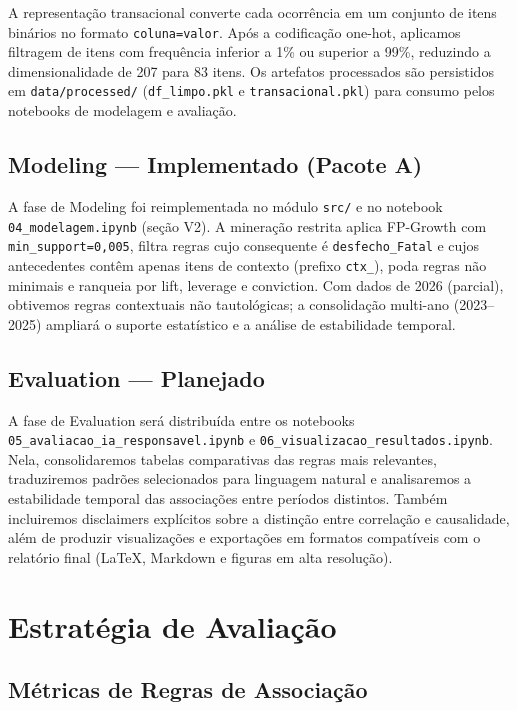 \documentclass[12pt]{article}
\begin{document}
A representação transacional converte cada ocorrência em um conjunto de itens binários no formato \texttt{coluna=valor}. Após a codificação one-hot, aplicamos filtragem de itens com frequência inferior a 1\% ou superior a 99\%, reduzindo a dimensionalidade de 207 para 83 itens. Os artefatos processados são persistidos em \texttt{data/processed/} (\texttt{df\_limpo.pkl} e \texttt{transacional.pkl}) para consumo pelos notebooks de modelagem e avaliação.

\subsection{Modeling --- Implementado (Pacote A)}

A fase de Modeling foi reimplementada no módulo \texttt{src/} e no notebook \texttt{04\_modelagem.ipynb} (seção V2). A mineração restrita aplica FP-Growth com \texttt{min\_support=0,005}, filtra regras cujo consequente é \texttt{desfecho\_Fatal} e cujos antecedentes contêm apenas itens de contexto (prefixo \texttt{ctx\_}), poda regras não minimais e ranqueia por lift, leverage e conviction. Com dados de 2026 (parcial), obtivemos regras contextuais não tautológicas; a consolidação multi-ano (2023--2025) ampliará o suporte estatístico e a análise de estabilidade temporal.

\subsection{Evaluation --- Planejado}

A fase de Evaluation será distribuída entre os notebooks \texttt{05\_avaliacao\_ia\_responsavel.ipynb} e \texttt{06\_visualizacao\_resultados.ipynb}. Nela, consolidaremos tabelas comparativas das regras mais relevantes, traduziremos padrões selecionados para linguagem natural e analisaremos a estabilidade temporal das associações entre períodos distintos. Também incluiremos disclaimers explícitos sobre a distinção entre correlação e causalidade, além de produzir visualizações e exportações em formatos compatíveis com o relatório final (LaTeX, Markdown e figuras em alta resolução).

\section{Estratégia de Avaliação}

\subsection{Métricas de Regras de Associação}
\end{document}
